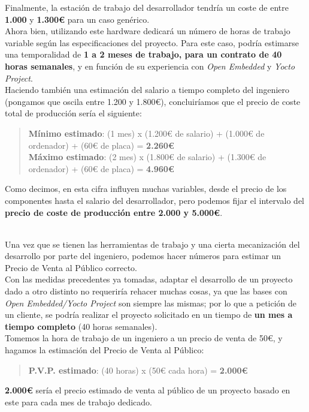 Finalmente, la estación de trabajo del desarrollador tendría un coste de entre \textbf{1.000} y \textbf{1.300€} para un caso genérico.\\

Ahora bien, utilizando este hardware dedicará un número de horas de trabajo variable según las especificaciones del proyecto. Para este caso, podría estimarse una temporalidad de \textbf{1 a 2 meses de trabajo, para un contrato de 40 horas semanales}, y en función de su experiencia con \textit{Open Embedded} y \textit{Yocto Project}.\\

Haciendo también una estimación del salario a tiempo completo del ingeniero (pongamos que oscila entre 1.200 y 1.800€), concluiríamos que el precio de coste total de producción sería el siguiente:

\begin{quotation}
	\textbf{Mínimo estimado\textit{}}: (1 mes) x (1.200€ de salario) + (1.000€ de ordenador) + (60€ de placa) = \textbf{2.260€}\\
	
	\textbf{Máximo estimado\textit{}}: (2 mes) x (1.800€ de salario) + (1.300€ de ordenador) + (60€ de placa) = \textbf{4.960€}
\end{quotation}

Como decimos, en esta cifra influyen muchas variables, desde el precio de los componentes hasta el salario del desarrollador, pero podemos fijar el intervalo del \textbf{precio de coste de producción entre 2.000 y 5.000€}. 

\noindent\makebox[\linewidth]{\rule{\textwidth}{0.4pt}}\\

Una vez que se tienen las herramientas de trabajo y una cierta mecanización del desarrollo por parte del ingeniero, podemos hacer números para estimar un Precio de Venta al Público correcto.\\

Con las medidas precedentes ya tomadas, adaptar el desarrollo de un proyecto dado a otro distinto no requeriría rehacer muchas cosas, ya que las bases con \textit{Open Embedded/Yocto Project} son siempre las mismas; por lo que a petición de un cliente, se podría realizar el proyecto solicitado en un tiempo de \textbf{un mes a tiempo completo} (40 horas semanales).\\

Tomemos la hora de trabajo de un ingeniero a un precio de venta de 50€, y hagamos la estimación del Precio de Venta al Público:

\begin{quotation}
	\textbf{P.V.P. estimado}: (40 horas) x (50€ cada hora) = \textbf{2.000€}
\end{quotation}

\textbf{2.000€} sería el precio estimado de venta al público de un proyecto basado en este para cada mes de trabajo dedicado.

\newpage